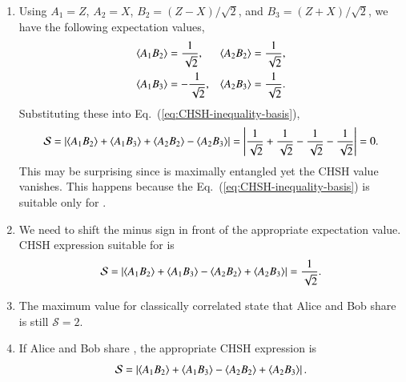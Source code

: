 \begin{solution}
\begin{enumerate}[label=(\alph*)]
    \item Using $A_1=Z$, $A_2=X$, $B_2=(Z-X)/\sqrt{2}$, and $B_3=(Z+X)/\sqrt{2}$, we have the following expectation values,
    \begin{align*}
        \langle A_1B_2 \rangle & = \frac{1}{\sqrt{2}}, & \langle A_2B_2 \rangle & = \frac{1}{\sqrt{2}}, \\
        \langle A_1B_3 \rangle & = -\frac{1}{\sqrt{2}}, & \langle A_2B_3 \rangle & = \frac{1}{\sqrt{2}}.
    \end{align*}
    Substituting these into Eq.~(\ref{eq:CHSH-inequality-basis}),
    \begin{equation*}
        \mathcal{S} = \left| \langle A_1B_2 \rangle + \langle A_1B_3 \rangle + \langle A_2B_2 \rangle - \langle A_2B_3 \rangle \right| = \left| \frac{1}{\sqrt{2}} + \frac{1}{\sqrt{2}} - \frac{1}{\sqrt{2}} - \frac{1}{\sqrt{2}} \right| = 0.
    \end{equation*}
    This may be surprising since \ket{\Phi^+} is maximally entangled yet the CHSH value vanishes. This happens because the Eq.~(\ref{eq:CHSH-inequality-basis}) is suitable only for \ket{\Psi^+}.
    \item We need to shift the minus sign in front of the appropriate expectation value. CHSH expression suitable for \ket{\Phi^+} is
    \begin{equation*}
        \mathcal{S} = \left| \langle A_1B_2 \rangle + \langle A_1B_3 \rangle - \langle A_2B_2 \rangle + \langle A_2B_3 \rangle \right| = \frac{1}{\sqrt{2}}.
    \end{equation*}
    \item The maximum value for classically correlated state that Alice and Bob share is still $\mathcal{S}=2$.
    \item If Alice and Bob share \ket{\Psi^-}, the appropriate CHSH expression is
    \begin{equation*}
        \mathcal{S} = \left| \langle A_1B_2 \rangle + \langle A_1B_3 \rangle - \langle A_2B_2 \rangle + \langle A_2B_3 \rangle \right|.
    \end{equation*}
\end{enumerate}
\end{solution}

